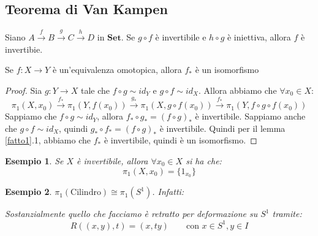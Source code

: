 \documentclass[11pt,a4paper,twoside]{article}
\newtheorem{es}{Esempio}
\theoremstyle{definition}
\begin{document}
\subsection{Teorema di Van Kampen}

\begin{lemma}{}{}\label{fatto1}
	Siano $A \xrightarrow{f} B \xrightarrow {g}C \xrightarrow{h}D$ in $\bm{Set}$. Se $g \circ f$ è invertibile e $h\circ g$ è iniettiva, allora $f$ è invertibie.
\end{lemma}

\begin{thm}{}{}
	Se $f:X \to Y$ è un'equivalenza omotopica, allora $f_*$ è un isomorfismo
\end{thm}
\begin{proof}
	Sia $g:Y \to X$ tale che $f \circ g \sim id_Y$ e $g \circ f \sim id_X$. Allora abbiamo che $\forall x_0 \in X$:
	\[ \pi_1(X, x_0) \xrightarrow{f_*} \pi_1(Y, f(x_0)) \xrightarrow{g_*} \pi_1(X, g \circ f(x_0)) \xrightarrow{f_*}\pi_1(Y, f\circ g \circ f(x_0)) \]
	Sappiamo che $f \circ g \sim id_Y$, allora $f_* \circ g_* = (f \circ g)_*$ è invertibile. Sappiamo anche che $g \circ f \sim id_X$, quindi $g_*\circ f_* = (f \circ g)_*$ è invertibile. Quindi per il lemma \ref{fatto1}.1, abbiamo che $f_*$ è invertibile, quindi è un isomorfismo.
\end{proof}

\begin{es}
	Se $X$ è invertibile, allora $\forall x_0 \in X$ si ha che:
	\[ \pi_1(X, x_0) = \{1_{x_0}\} \]
\end{es}

\begin{es} $\pi_1(\text{Cilindro})\cong \pi_1(S^1)$. Infatti:
	\begin{center}
	\end{center}
	Sostanzialmente quello che facciamo è retratto per deformazione su $S^1$ tramite:
	\[ R((x,y), t) = (x,ty)\qquad \text{con }x \in S^1, y \in I \]
\end{es}
\end{document}
